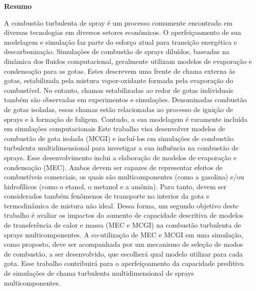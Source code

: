 
\vspace{2cm}

{ \Large \textbf{Resumo}}

\vspace{0.8cm}

{

\noindent %
A combustão turbulenta de spray é um processo comumente encontrado em diversas tecnologias em diversos setores econômicos. 
O aperfeiçoamento de sua modelagem e simulação faz parte do esforço atual para transição energética e descarbonização.
Simulações de combustão de sprays diluídos, baseadas na dinâmica dos fluidos computacional, geralmente utilizam modelos de evaporação e condensação para as gotas.
Estes descrevem uma frente de chama externa às gotas, estabilizada pela mistura vapor-oxidante formada pela evaporação do combustível.
No entanto, chamas estabilizadas ao redor de gotas individuais também são observadas em experimentos e simulações.
Denominadas combustão de gotas isoladas, essas chamas estão relacionadas ao processo de ignição de sprays e à formação de fuligem.
Contudo, a sua modelagem é raramente incluída em simulações computacionais
Este trabalho visa desenvolver modelos de combustão de gota isolada (MCGI) e incluí-los em simulações de combustão turbulenta multidimensional para investigar a sua influência na combustão de sprays.
Esse desenvolvimento inclui a elaboração de modelos de evaporação e condensação (MEC).
Ambos devem ser capazes de representar efeitos de combustíveis comerciais, os quais são multicomponentes (como a gasolina) e/ou hidrofílicos (como o etanol, o metanol e a amônia). 
Para tanto, devem ser considerados também fenômenos de transporte no interior da gota e termodinâmica de mistura não ideal.
Dessa forma, um segundo objetivo deste trabalho é avaliar os impactos do aumento de capacidade descritiva de modelos de transferência de calor e massa (MEC e MCGI) na combustão turbulenta de sprays multicomponentes.
A co-utilização de MEC e MCGI em uma simulação, como proposto, deve ser acompanhada por um mecanismo de seleção de modos de combustão, a ser desenvolvido, que escolherá qual modelo utilizar para cada gota.
Esse trabalho contribuirá para o aperfeiçoamento da capacidade preditiva de simulações de chama turbulenta multidimensional de sprays multicomponentes.

}

